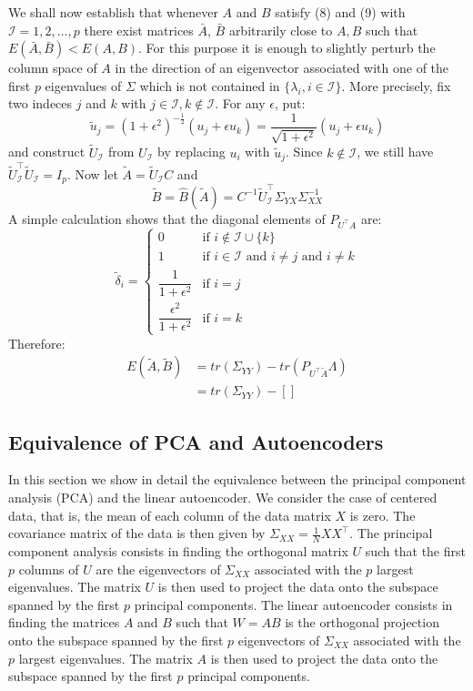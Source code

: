 We shall now establish that whenever $A$ and $B$ satisfy (8) and (9) with $\mathcal{I} = {1,  2, \dots, p}$ there exist matrices $\bar{A}$, $\bar{B}$ arbitrarily close to $A,B$ such that $E(\bar{A},\bar{B}) < E(A,B)$. For this purpose it is enough to slightly perturb the column space of $A$ in the direction of an eigenvector associated with one of the first $p$ eigenvalues of $\Sigma$ which is not contained in $\{\lambda_i, i \in \mathcal{I}\}$. More precisely, fix two indeces $j$ and $k$ with $j \in \mathcal{I}, k \not\in \mathcal{I}$. For any $\epsilon$, put:
\[
    \tilde{u}_j = (1+\epsilon^2)^{-\frac{1}{2}}(u_j + \epsilon u_k) = \dfrac{1}{\sqrt{1+\epsilon^2}}(u_j + \epsilon u_k) 
\]
and construct $\tilde{U}_\mathcal{I}$ from $U_\mathcal{I}$ by replacing $u_i$ with $\tilde{u}_j$. Since $k \not\in \mathcal{I}$, we still have $\tilde{U}^\intercal_\mathcal{I} \tilde{U}_\mathcal{I} = I_p$. Now let $\tilde{A} = \tilde{U}_\mathcal{I} C$ and
\[
    \tilde{B} = \hat{B}(\tilde{A}) = C^{-1}\tilde{U}^\intercal_\mathcal{I} \Sigma_{YX}\Sigma_{XX}^{-1}    
\]
A simple calculation shows that the diagonal elements of $P_{U^\intercal A}$ are:
\[
    \tilde{\delta}_i = 
    \begin{cases}
        0 & \text{if } i \not \in \mathcal{I} \cup \{k\}\\
        1 & \text{if } i \in \mathcal{I} \text{ and } i \neq j \text{ and } i \neq k\\
        \dfrac{1}{1+\epsilon^2} & \text{if } i = j\\
        \dfrac{\epsilon^2}{1 + \epsilon^2} &\text{if } i = k
    \end{cases}    
\]
Therefore:
\[
    \begin{split}
        E(\tilde{A},\tilde{B}) &= tr(\Sigma_{YY}) - tr(P_{U^\intercal \tilde{A}}\Lambda)\\
        &= tr(\Sigma_{YY}) - \left[\right]
    \end{split}    
\]

\subsection{Equivalence of PCA and Autoencoders}
In this section we show in detail the equivalence between the principal component analysis (PCA) and the linear autoencoder. We consider the case of centered data, that is, the mean of each column of the data matrix $X$ is zero. The covariance matrix of the data is then given by $\Sigma_{XX} = \frac{1}{N}XX^\intercal$. The principal component analysis consists in finding the orthogonal matrix $U$ such that the first $p$ columns of $U$ are the eigenvectors of $\Sigma_{XX}$ associated with the $p$ largest eigenvalues. The matrix $U$ is then used to project the data onto the subspace spanned by the first $p$ principal components. The linear autoencoder consists in finding the matrices $A$ and $B$ such that $W = AB$ is the orthogonal projection onto the subspace spanned by the first $p$ eigenvectors of $\Sigma_{XX}$ associated with the $p$ largest eigenvalues. The matrix $A$ is then used to project the data onto the subspace spanned by the first $p$ principal components.